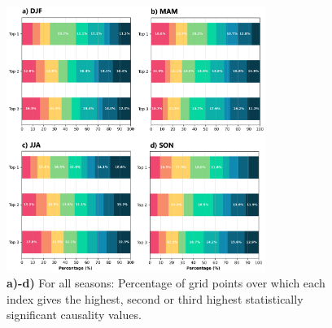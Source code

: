 \documentclass[10pt,twocolumn]{wlscirep}
\begin{document}
\begin{figure}[!ht]
  \centering
  \includegraphics[width=0.75\textwidth]{correlation_barplots.png}
  \caption{\textbf{a)-d)} For all seasons: Percentage of grid points over which each index gives the highest, second or third highest statistically significant causality values.}
  \label{fig:panama-correlation-niño-34}
\end{figure}
\end{document}
